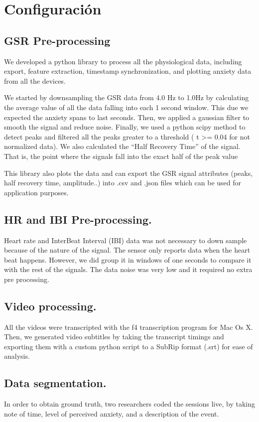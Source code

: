 \section{Configuraci\'on}

\subsection{GSR Pre-processing}
We developed a python library to process all the physiological
data, including export, feature extraction, timestamp 
synchronization, and plotting anxiety data from all the devices.


We started by downsampling the GSR data from 4.0 Hz to 1.0Hz
by calculating the average value of all the data falling 
into each 1 second window. This due we expected the anxiety
spans to last seconds. Then, we applied a gaussian filter to
smooth the signal and reduce noise. Finally, we used a python
scipy method to detect peaks and filtered all the peaks greater
to a threshold ( t >= 0.04 for not normalized data). 
We also calculated the ``Half Recovery Time'' of the signal.
That is, the point where the signals fall into the exact 
half of the peak value

This library also plots the data and can export the
GSR signal attributes (peaks, half recovery time, amplitude..)
into .csv and .json files which can be used for application
purposes.
	
\subsection{HR and IBI Pre-processing.}
Heart rate and InterBeat Interval (IBI) 
data was not necessary to down sample because
of the nature of the signal. The sensor only
reports data when the heart beat happens. However,
we did group it in windows of one seconds to compare
it with the rest of the signals. The data noise was
very low and it required no extra pre processing.
\subsection{Video processing.}
All the videos were transcripted with the f4 
transcription program for Mac Os X. Then, we generated 
video subtitles by taking the transcript timings and 
exporting them with a custom python script to a SubRip 
format (.srt) for ease of analysis.


\subsection{Data segmentation.}
In order to obtain ground truth, two researchers coded
the sessions live, by taking note of time, level of 
perceived anxiety, and a description of the event.

